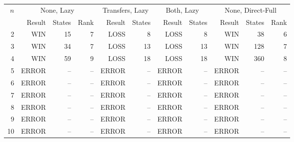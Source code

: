 \begin{tabular}{r|rrr|rr|rr|rrr}
\toprule
$n$ & \multicolumn{3}{c|}{None, Lazy} & \multicolumn{2}{c|}{Transfers, Lazy} & \multicolumn{2}{c|}{Both, Lazy} & \multicolumn{3}{c}{None, Direct-Full} \\
 & Result & States & Rank & Result & States & Result & States & Result & States & Rank \\
\midrule
2 & WIN & 15 & 7 & LOSS & 8 & LOSS & 8 & WIN & 38 & 6 \\
3 & WIN & 34 & 7 & LOSS & 13 & LOSS & 13 & WIN & 128 & 7 \\
4 & WIN & 59 & 9 & LOSS & 18 & LOSS & 18 & WIN & 360 & 8 \\
5 & ERROR & -- & -- & ERROR & -- & ERROR & -- & ERROR & -- & -- \\
6 & ERROR & -- & -- & ERROR & -- & ERROR & -- & ERROR & -- & -- \\
7 & ERROR & -- & -- & ERROR & -- & ERROR & -- & ERROR & -- & -- \\
8 & ERROR & -- & -- & ERROR & -- & ERROR & -- & ERROR & -- & -- \\
9 & ERROR & -- & -- & ERROR & -- & ERROR & -- & ERROR & -- & -- \\
10 & ERROR & -- & -- & ERROR & -- & ERROR & -- & ERROR & -- & -- \\
\bottomrule
\end{tabular}
